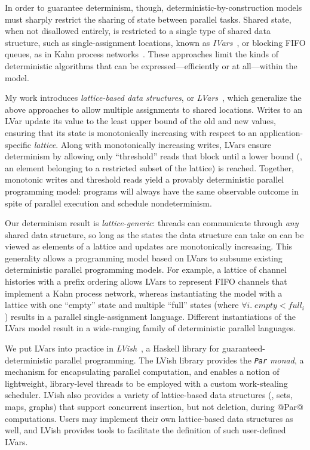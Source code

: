 \documentclass{article}
\begin{document}
In order to guarantee determinism, though, deterministic-by-construction
models must sharply restrict the sharing of state between parallel
tasks.  Shared state, when not disallowed entirely, is restricted to a
single type of shared data structure, such as single-assignment
locations, known as \emph{IVars}~\cite{IStructures, CnC}, or blocking
FIFO queues, as in Kahn process networks~\cite{Kahn-1974}.  These
approaches limit the kinds of deterministic algorithms that can be
expressed---efficiently or at all---within the model.




My work introduces \emph{lattice-based data structures}, or
\emph{LVars}~\cite{LVars-paper, LVars-TR}, which generalize the above
approaches to allow multiple assignments to shared locations.  Writes
to an LVar update its value to the least upper bound of the old and
new values, ensuring that its state is monotonically increasing with
respect to an application-specific \emph{lattice}.  Along with
monotonically increasing writes, LVars ensure determinism by allowing
only ``threshold'' reads that block until a lower bound (\ie, an
element belonging to a restricted subset of the lattice) is reached.
Together, monotonic writes and threshold reads yield a provably
deterministic parallel programming model: programs will always have
the same observable outcome in spite of parallel execution and
schedule nondeterminism.

Our determinism result is \emph{lattice-generic}: threads can
communicate through \emph{any} shared data structure, so long as the
states the data structure can take on can be viewed as elements of a
lattice and updates are monotonically increasing.  This generality
allows a programming model based on LVars to subsume existing
deterministic parallel programming models.  For example, a lattice of
channel histories with a prefix ordering allows LVars to represent
FIFO channels that implement a Kahn process network, whereas
instantiating the model with a lattice with one ``empty'' state and
multiple ``full'' states (where $\forall{i}.\; \mathit{empty} <
\mathit{full_i}$) results in a parallel single-assignment language.
Different instantiations of the LVars model result in a wide-ranging
family of deterministic parallel languages.

We put LVars into practice in \emph{LVish}~\cite{LVish}, a Haskell
library for guaranteed-deterministic parallel programming.  The LVish
library provides the \emph{\lstinline|Par| monad}, a mechanism for
encapsulating parallel computation, and enables a notion of
lightweight, library-level threads to be employed with a custom
work-stealing scheduler.  LVish also provides a variety of
lattice-based data structures (\eg, sets, maps, graphs) that support
concurrent insertion, but not deletion, during @Par@ computations.
Users may implement their own lattice-based data structures as well,
and LVish provides tools to facilitate the definition of such
user-defined LVars.
\end{document}
